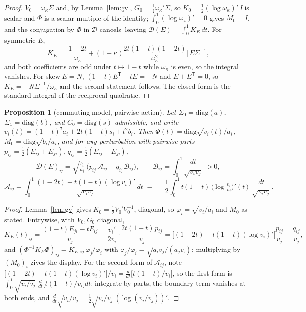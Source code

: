 \documentclass[11pt]{article}
\newcommand{\T}{\mathsf{T}}
\newtheorem{proposition}{Proposition}
\theoremstyle{remark}
\begin{document}
\begin{proof}
$V_0=\omega_\kappa\Sigma$ and, by Lemma~\ref{lem:gv}, $G_0=\tfrac12\omega_\kappa'\Sigma$, so
$K_0=\tfrac12(\log\omega_\kappa)'\,I$ is scalar and $\Phi$ is a scalar multiple of the identity;
$\int_0^1(\log\omega_\kappa)'=0$ gives $M_0=I$, and the conjugation by $\Phi$ in $\mathcal D$
cancels, leaving $\mathcal D(E)=\int_0^1K_E\,dt$. For symmetric $E$,
\[
K_E=\Big[\frac{1-2t}{\omega_\kappa}
+(1-\kappa)\frac{2t(1-t)(1-2t)}{\omega_\kappa^{2}}\Big]\,E\Sigma^{-1},
\]
and both coefficients are odd under $t\mapsto1-t$ while $\omega_\kappa$ is even, so the integral
vanishes. For skew $E=N$, $(1-t)E^{\T}-tE=-N$ and $E+E^{\T}=0$, so
$K_E=-N\Sigma^{-1}/\omega_\kappa$ and the second statement follows. The closed form is the
standard integral of the reciprocal quadratic.
\end{proof}

\begin{proposition}[commuting model, pairwise action]\label{prop:pair}
Let $\Sigma_0=\mathrm{diag}(a)$, $\Sigma_1=\mathrm{diag}(b)$, and $C_0=\mathrm{diag}(s)$
admissible, and write $v_i(t)=(1-t)^2a_i+2t(1-t)s_i+t^2b_i$. Then
$\Phi(t)=\mathrm{diag}\sqrt{v_i(t)/a_i}$, $M_0=\mathrm{diag}\sqrt{b_i/a_i}$, and for any
perturbation with pairwise parts $p_{ij}=\tfrac12(E_{ij}+E_{ji})$,
$q_{ij}=\tfrac12(E_{ij}-E_{ji})$,
\[
\mathcal D(E)_{ij}
=\sqrt{\tfrac{b_i}{a_j}}\,\big(p_{ij}\,\mathcal A_{ij}-q_{ij}\,\mathcal B_{ij}\big),
\qquad
\mathcal B_{ij}=\int_0^1\frac{dt}{\sqrt{v_iv_j}}\;>0,
\]
\[
\mathcal A_{ij}
=\int_0^1\frac{(1-2t)-t(1-t)(\log v_i)'}{\sqrt{v_iv_j}}\,dt
\;=\;-\frac12\int_0^1 t(1-t)\,\big(\log\tfrac{v_i}{v_j}\big)'(t)\,
\frac{dt}{\sqrt{v_iv_j}}.
\]
\end{proposition}

\begin{proof}
Lemma~\ref{lem:gv} gives $K_0=\tfrac12 V_0'V_0^{-1}$, diagonal, so
$\varphi_i=\sqrt{v_i/a_i}$ and $M_0$ as stated. Entrywise, with $V_0,G_0$ diagonal,
\[
K_E(t)_{ij}
=\frac{(1-t)E_{ji}-tE_{ij}}{v_j}
-\frac{v_i'}{2v_i}\cdot\frac{2t(1-t)\,p_{ij}}{v_j}
=\Big[(1-2t)-t(1-t)(\log v_i)'\Big]\frac{p_{ij}}{v_j}-\frac{q_{ij}}{v_j},
\]
and $(\Phi^{-1}K_E\Phi)_{ij}=K_{E,ij}\,\varphi_j/\varphi_i$ with
$\varphi_j/\varphi_i=\sqrt{a_iv_j/(a_jv_i)}$; multiplying by $(M_0)_i$ gives the display. For the
second form of $\mathcal A_{ij}$, note
$\big[(1-2t)-t(1-t)(\log v_i)'\big]/v_i=\tfrac{d}{dt}\big[t(1-t)/v_i\big]$, so the first form is
$\int_0^1\sqrt{v_i/v_j}\;\tfrac{d}{dt}\big[t(1-t)/v_i\big]dt$; integrate by parts, the boundary
term vanishes at both ends, and
$\tfrac{d}{dt}\sqrt{v_i/v_j}=\tfrac12\sqrt{v_i/v_j}\,(\log(v_i/v_j))'$.
\end{proof}
\end{document}
